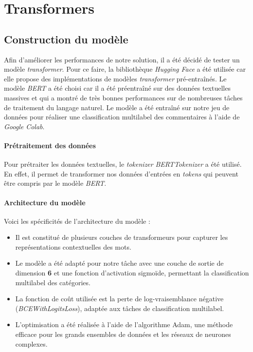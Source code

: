 \chapter{Transformers}

\section{Construction du modèle}

Afin d'améliorer les performances de notre solution, il a été décidé de tester un modèle \textit{transformer}.
Pour ce faire, la bibliothèque \textit{Hugging Face} a été utilisée car elle propose des implémentations de modèles \textit{transformer} pré-entraînés.
Le modèle \textit{BERT} a été choisi car il a été préentraîné sur des données textuelles massives et qui a montré de très bonnes performances sur de nombreuses tâches de traitement du langage naturel.
Le modèle a été entraîné sur notre jeu de données pour réaliser une classification multilabel des commentaires à l'aide de \textit{Google Colab}.

\subsubsection{Prétraitement des données}

Pour prétraiter les données textuelles, le \textit{tokenizer} \textit{BERTTokenizer} a été utilisé. En effet, il permet de transformer nos données d'entrées en \textit{tokens} qui peuvent être compris par le modèle \textit{BERT}.

\subsubsection{Architecture du modèle}

Voici les spécificités de l'architecture du modèle :

\begin{itemize}
\item Il est constitué de plusieurs couches de transformeurs pour capturer les représentations contextuelles des mots.
\item Le modèle a été adapté pour notre tâche avec une couche de sortie de dimension \textbf{6} et une fonction d'activation sigmoïde, permettant la classification multilabel des catégories.
\item La fonction de coût utilisée est la perte de log-vraisemblance négative (\textit{BCEWithLogitsLoss}), adaptée aux tâches de classification multilabel.
\item L'optimisation a été réalisée à l'aide de l'algorithme Adam, une méthode efficace pour les grands ensembles de données et les réseaux de neurones complexes.
\end{itemize}

